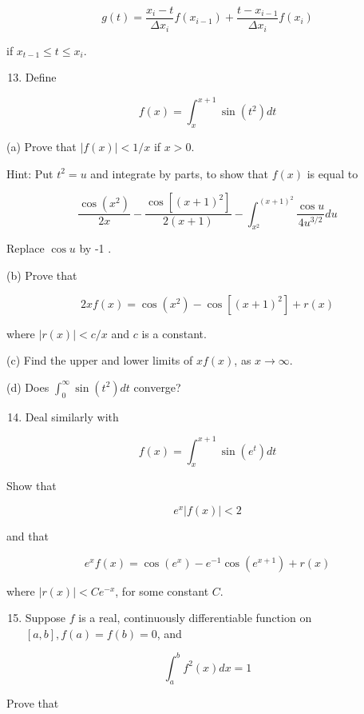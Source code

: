 \documentclass[10pt]{article}
\begin{document}
$$
g(t)=\frac{x_{i}-t}{\Delta x_{i}} f\left(x_{i-1}\right)+\frac{t-x_{i-1}}{\Delta x_{i}} f\left(x_{i}\right)
$$

if $x_{t-1} \leq t \leq x_{i}$.

\begin{enumerate}
  \setcounter{enumi}{12}
  \item Define
\end{enumerate}

$$
f(x)=\int_{x}^{x+1} \sin \left(t^{2}\right) d t
$$

(a) Prove that $|f(x)|<1 / x$ if $x>0$.

Hint: Put $t^{2}=u$ and integrate by parts, to show that $f(x)$ is equal to

$$
\frac{\cos \left(x^{2}\right)}{2 x}-\frac{\cos \left[(x+1)^{2}\right]}{2(x+1)}-\int_{x^{2}}^{(x+1)^{2}} \frac{\cos u}{4 u^{3 / 2}} d u
$$

Replace $\cos u$ by -1 .

(b) Prove that

$$
2 x f(x)=\cos \left(x^{2}\right)-\cos \left[(x+1)^{2}\right]+r(x)
$$

where $|r(x)|<c / x$ and $c$ is a constant.

(c) Find the upper and lower limits of $x f(x)$, as $x \rightarrow \infty$.

(d) Does $\int_{0}^{\infty} \sin \left(t^{2}\right) d t$ converge?

\begin{enumerate}
  \setcounter{enumi}{13}
  \item Deal similarly with
\end{enumerate}

$$
f(x)=\int_{x}^{x+1} \sin \left(e^{t}\right) d t
$$

Show that

$$
e^{x}|f(x)|<2
$$

and that

$$
e^{x} f(x)=\cos \left(e^{x}\right)-e^{-1} \cos \left(e^{x+1}\right)+r(x)
$$

where $|r(x)|<C e^{-x}$, for some constant $C$.

\begin{enumerate}
  \setcounter{enumi}{14}
  \item Suppose $f$ is a real, continuously differentiable function on $[a, b], f(a)=f(b)=0$, and
\end{enumerate}

$$
\int_{a}^{b} f^{2}(x) d x=1
$$

Prove that
\end{document}

